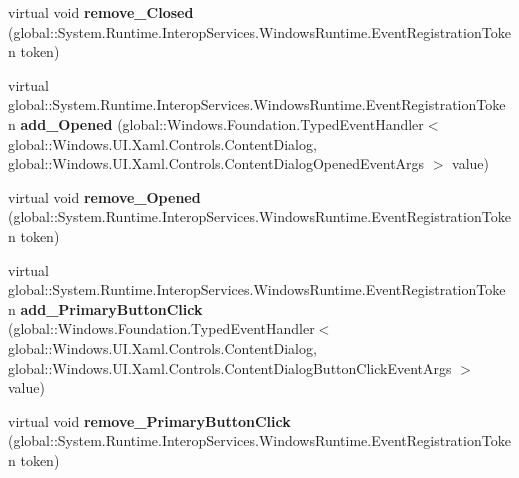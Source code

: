 \begin{DoxyCompactItemize}
\item 
\mbox{\label{class_windows_1_1_u_i_1_1_xaml_1_1_controls_1_1_content_dialog_aa69d94be955777eb910008418fd76375}} 
virtual void {\bfseries remove\+\_\+\+Closed} (global\+::\+System.\+Runtime.\+Interop\+Services.\+Windows\+Runtime.\+Event\+Registration\+Token token)
\item 
\mbox{\label{class_windows_1_1_u_i_1_1_xaml_1_1_controls_1_1_content_dialog_a140644918023f750ab438dadf16adbc6}} 
virtual global\+::\+System.\+Runtime.\+Interop\+Services.\+Windows\+Runtime.\+Event\+Registration\+Token {\bfseries add\+\_\+\+Opened} (global\+::\+Windows.\+Foundation.\+Typed\+Event\+Handler$<$ global\+::\+Windows.\+U\+I.\+Xaml.\+Controls.\+Content\+Dialog, global\+::\+Windows.\+U\+I.\+Xaml.\+Controls.\+Content\+Dialog\+Opened\+Event\+Args $>$ value)
\item 
\mbox{\label{class_windows_1_1_u_i_1_1_xaml_1_1_controls_1_1_content_dialog_aca373dad7a49f1f4e1bd7b41f5ea7703}} 
virtual void {\bfseries remove\+\_\+\+Opened} (global\+::\+System.\+Runtime.\+Interop\+Services.\+Windows\+Runtime.\+Event\+Registration\+Token token)
\item 
\mbox{\label{class_windows_1_1_u_i_1_1_xaml_1_1_controls_1_1_content_dialog_a3e36b19b3f4893d9fb0f02a0521e5d93}} 
virtual global\+::\+System.\+Runtime.\+Interop\+Services.\+Windows\+Runtime.\+Event\+Registration\+Token {\bfseries add\+\_\+\+Primary\+Button\+Click} (global\+::\+Windows.\+Foundation.\+Typed\+Event\+Handler$<$ global\+::\+Windows.\+U\+I.\+Xaml.\+Controls.\+Content\+Dialog, global\+::\+Windows.\+U\+I.\+Xaml.\+Controls.\+Content\+Dialog\+Button\+Click\+Event\+Args $>$ value)
\item 
\mbox{\label{class_windows_1_1_u_i_1_1_xaml_1_1_controls_1_1_content_dialog_ad87d51f3f0f3f6e07586f13e8912c5dc}} 
virtual void {\bfseries remove\+\_\+\+Primary\+Button\+Click} (global\+::\+System.\+Runtime.\+Interop\+Services.\+Windows\+Runtime.\+Event\+Registration\+Token token)
\item 
\mbox{\label{class_windows_1_1_u_i_1_1_xaml_1_1_controls_1_1_content_dialog_aa769bea5ba29f6714032e97410b15b2f}} 

\end{DoxyCompactItemize}
